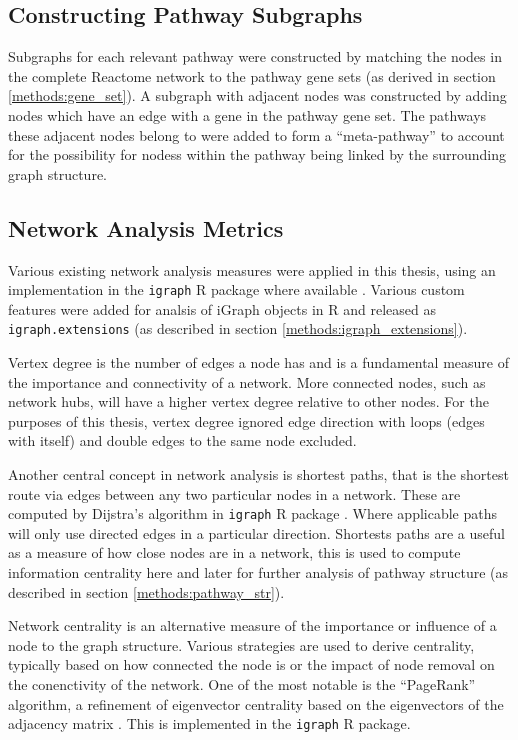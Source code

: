 \subsection{Constructing Pathway Subgraphs}
Subgraphs for each relevant pathway were constructed by matching the nodes in the complete Reactome network to the pathway gene sets (as derived in section \ref{methods:gene_set}). A subgraph with adjacent nodes was constructed by adding nodes which have an edge with a gene in the pathway gene set. The pathways these adjacent nodes belong to were added to form a ``meta-pathway'' to account for the possibility for nodess within the pathway being linked by the surrounding graph structure.

\subsection{Network Analysis Metrics} \label{methods:network_metrics}
Various existing network analysis measures were applied in this thesis, using an implementation in the \texttt{igraph} R package where available \citep{igraph}. Various custom features were added for analsis of iGraph objects in R and released as \texttt{igraph.extensions} (as described in section \ref{methods:igraph_extensions}).

Vertex degree is the number of edges a node has and is a fundamental measure of the importance and connectivity of a network. More connected nodes, such as network hubs, will have a higher vertex degree relative to other nodes. For the purposes of this thesis, vertex degree ignored edge direction with loops (edges with itself) and double edges to the same node excluded.

Another central concept in network analysis is shortest paths, that is the shortest route via edges between any two particular nodes in a network. These are computed by Dijstra's algorithm in \texttt{igraph} R package \citep{igraph}. Where applicable paths will only use directed edges in a particular direction. Shortests paths are a useful as a measure of how close nodes are in a network, this is used to compute information centrality here and later for further analysis of pathway structure (as described in section \ref{methods:pathway_str}).

Network centrality is an alternative measure of the importance or influence of a node to the graph structure. Various strategies are used to derive centrality,  typically based on how connected the node is or the impact of node removal on the conenctivity of the network. One of the most notable is the ``PageRank'' algorithm, a refinement of eigenvector centrality based on the eigenvectors of the adjacency matrix \citep{Brin1998}. This is implemented in the \texttt{igraph} R package.

